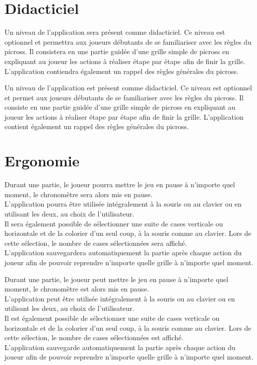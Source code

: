 \documentclass{report}
\begin{document}
		\section{Didacticiel}
			Un niveau de l'application sera présent comme didacticiel. Ce niveau est optionnel et permettra aux joueurs débutants de se familiariser avec les règles du picross. Il consistera en une partie guidée d'une grille simple de picross en expliquant au joueur les actions à réaliser étape par étape afin de finir la grille. L'application contiendra également un rappel des règles générales du picross.

			Un niveau de l'application est présent comme didacticiel. Ce niveau est optionnel et permet aux joueurs débutants de se familiariser avec les règles du picross. Il consiste en une partie guidée d'une grille simple de picross en expliquant au joueur les actions à réaliser étape par étape afin de finir la grille. L'application contient également un rappel des règles générales du picross.

		\section{Ergonomie}
			Durant une partie, le joueur pourra mettre le jeu en pause à n'importe quel moment, le chronomètre sera alors mis en pause.\\
     		L'application pourra être utilisée intégralement à la souris ou au clavier ou en utilisant les deux, au choix de l'utilisateur.\\
			Il sera également possible de sélectionner une suite de cases verticale ou horizontale et de la colorier d'un seul coup, à la souris comme au clavier. Lors de cette sélection, le nombre de cases sélectionnées sera affiché.\\
			L'application sauvegardera automatiquement la partie après chaque action du joueur afin de pouvoir reprendre n'importe quelle grille à n'importe quel moment.

			Durant une partie, le joueur peut mettre le jeu en pause à n'importe quel moment, le chronomètre est alors mis en pause.\\
     		L'application peut être utilisée intégralement à la souris ou au clavier ou en utilisant les deux, au choix de l'utilisateur.\\
			Il est également possible de sélectionner une suite de cases verticale ou horizontale et de la colorier d'un seul coup, à la souris comme au clavier. Lors de cette sélection, le nombre de cases sélectionnées est affiché.\\
			L'application sauvegarde automatiquement la partie après chaque action du joueur afin de pouvoir reprendre n'importe quelle grille à n'importe quel moment.
\end{document}
